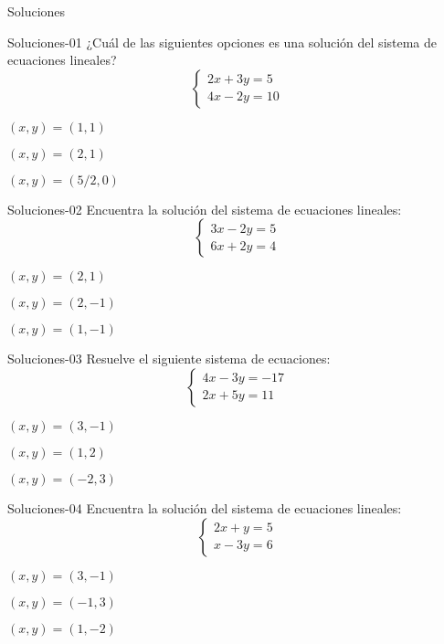 \documentclass[a4,11pt]{aleph-notas}
\begin{document}
\begin{quiz}{Soluciones}
    
\begin{multi}[]%
    {Soluciones-01}
    ¿Cuál de las siguientes opciones es una solución del sistema de ecuaciones lineales?
    \[
        \begin{cases}
            2x + 3y = 5 \\
            4x - 2y = 10
        \end{cases}
    \]
    \item $(x, y) = (1, 1)$
    \item $(x, y) = (2, 1)$
    \item* $(x, y) = (5/2, 0)$
\end{multi}
        
\begin{multi}[]%
    {Soluciones-02}
    Encuentra la solución del sistema de ecuaciones lineales:
    \[
    \begin{cases}
    3x - 2y = 5 \\
    6x + 2y = 4
    \end{cases}
    \]
    \item $(x, y) = (2, 1)$
    \item $(x, y) = (2, -1)$
    \item* $(x, y) = (1, -1)$
\end{multi}
        
\begin{multi}[]%
    {Soluciones-03}
    Resuelve el siguiente sistema de ecuaciones:
    \[
    \begin{cases}
    4x - 3y = -17 \\
    2x + 5y = 11
    \end{cases}
    \]
    \item $(x, y) = (3, -1)$
    \item $(x, y) = (1, 2)$
    \item* $(x, y) = (-2, 3)$
\end{multi}
        
\begin{multi}[]%
    {Soluciones-04}
    Encuentra la solución del sistema de ecuaciones lineales:
    \[
    \begin{cases}
    2x + y = 5 \\
    x - 3y = 6
    \end{cases}
    \]
    \item* $(x, y) = (3, -1)$
    \item $(x, y) = (-1, 3)$
    \item $(x, y) = (1, -2)$
\end{multi}
        

\end{quiz}
\end{document}
